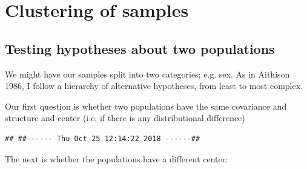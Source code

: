 \documentclass{article}
\begin{document}
\section{Clustering of samples}



\clearpage

\subsection{Testing hypotheses about two populations}
We might have our samples split into two categories; e.g. sex. As in Aithison 1986\cite{}, I follow a hierarchy of alternative hypotheses, from least to most complex.

Our first question is whether two populations have the same covariance and structure and center (i.e. if there is any distributional difference)

\begin{knitrout}
\color{fgcolor}\begin{kframe}
\begin{alltt}
\hlstd{()}
\end{alltt}
\begin{verbatim}
## ##------ Thu Oct 25 12:14:22 2018 ------##
\end{verbatim}
\begin{alltt}
\end{alltt}
\end{kframe}
\end{knitrout}

The next is whether the populations have a different center:
\end{document}
